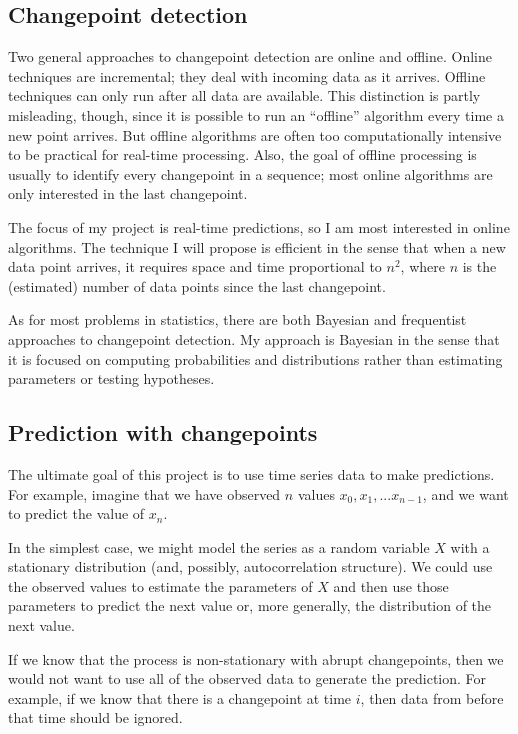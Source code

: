 \documentclass[twocolumn,11pt]{article}
\begin{document}
\subsection{Changepoint detection}

Two general approaches to changepoint detection are online and
offline.  Online techniques are incremental; they deal with incoming
data as it arrives.  Offline techniques can only run after all data are
available.  This distinction is partly misleading, though, since it is
possible to run an ``offline'' algorithm every time a new point
arrives.  But offline algorithms are often too
computationally intensive to be practical for real-time processing.
Also, the goal of offline processing is usually to identify every
changepoint in a sequence; most online algorithms are only interested
in the last changepoint.

The focus of my project is real-time predictions, so I am most
interested in online algorithms.  The technique I will propose
is efficient in the sense that when a new data point arrives, it
requires space and time proportional to $n^2$, where $n$ is the
(estimated) number of data points since the last changepoint.

As for most problems in statistics, there are both Bayesian and
frequentist approaches to changepoint detection.  My approach is
Bayesian in the sense that it is focused on computing probabilities
and distributions rather than estimating parameters or testing
hypotheses.


\subsection{Prediction with changepoints}

The ultimate goal of this project is to use time series data to make
predictions.  For example, imagine that we have observed $n$ values
$x_0, x_1, ... x_{n-1}$, and we want to predict the value of $x_n$.

In the simplest case, we might model the series as a random variable
$X$ with a stationary distribution (and, possibly, autocorrelation
structure).  We could use the observed values to estimate the
parameters of $X$ and then use those parameters to predict the next
value or, more generally, the distribution of the next value.

If we know that the process is non-stationary with abrupt changepoints,
then we would not want to use all of the observed data to generate
the prediction.  For example, if we know that there is a changepoint
at time $i$, then data from before that time should be ignored.
\end{document}
